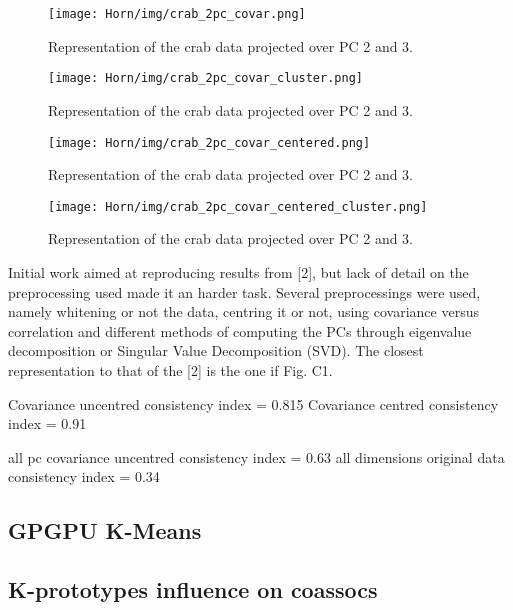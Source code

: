 \begin{figure}[hbtp]
\centering
\texttt{[image: Horn/img/crab\_2pc\_covar.png]}
\caption{Representation of the crab data projected over PC 2 and 3.}
\label{fig:crab_2pc_covar}
\end{figure}

\begin{figure}[hbtp]
\centering
\texttt{[image: Horn/img/crab\_2pc\_covar\_cluster.png]}
\caption{Representation of the crab data projected over PC 2 and 3.}
\label{fig:crab_2pc_covar_cluster}
\end{figure}

\begin{figure}[hbtp]
\centering
\texttt{[image: Horn/img/crab\_2pc\_covar\_centered.png]}
\caption{Representation of the crab data projected over PC 2 and 3.}
\label{fig:crab_2pc_covar_centered}
\end{figure}

\begin{figure}[hbtp]
\centering
\texttt{[image: Horn/img/crab\_2pc\_covar\_centered\_cluster.png]}
\caption{Representation of the crab data projected over PC 2 and 3.}
\label{fig:crab_2pc_covar_centered_cluster}
\end{figure}


Initial work aimed at reproducing results from [2], but lack of detail on the preprocessing used made it an harder task. Several preprocessings were used, namely whitening or not the data, centring it or not, using covariance versus correlation and different methods of computing the PCs through eigenvalue decomposition or Singular Value Decomposition (SVD). The closest representation to that of the [2] is the one if Fig. C1.



Covariance uncentred consistency index = 0.815
Covariance centred consistency index = 0.91

all pc covariance uncentred consistency index = 0.63
all dimensions original data consistency index = 0.34


\subsection{GPGPU K-Means}




\subsection{K-prototypes influence on coassocs}